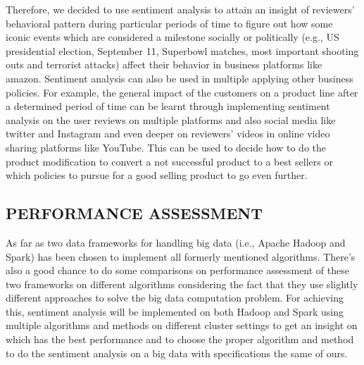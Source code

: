 Therefore, we decided to use sentiment analysis to attain an insight of reviewers’ behavioral pattern during particular periods of time to figure out how some iconic events which are considered a milestone socially or politically (e.g., US presidential election, September 11, Superbowl matches, most important shooting outs and terrorist attacks) affect their behavior in business platforms like amazon. Sentiment analysis can also be used in multiple applying other business policies. For example, the general impact of the customers on a product line after a determined period of time can be learnt through implementing sentiment analysis on the user reviews on multiple platforms and also social media like twitter and Instagram and even deeper on reviewers’ videos in online video sharing platforms like YouTube. This can be used to decide how to do the product modification to convert a not successful product to a best sellers or which policies to pursue for a good selling product to go even further. 

\subsection{PERFORMANCE ASSESSMENT}
As far as two data frameworks for handling big data (i.e., Apache Hadoop and Spark) has been chosen to implement all formerly mentioned algorithms. There’s also a good chance to do some comparisons on performance assessment of these two frameworks on different algorithms considering the fact that they use slightly different approaches to solve the big data computation problem. For achieving this, sentiment analysis will be implemented on both Hadoop and Spark using multiple algorithms and methods on different cluster settings to get an insight on which has the best performance and to choose the proper algorithm and method to do the sentiment analysis on a big data with specifications the same of ours.

